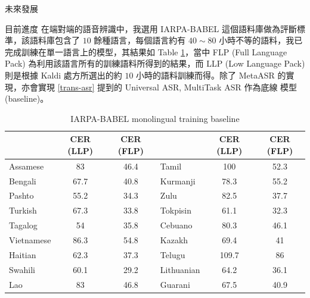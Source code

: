 \documentclass[12pt,UTF8,fntef]{article}
\begin{document}
\begin{section}{未來發展}
  \begin{subsection}{目前進度} \label{progress}
    在端對端的語音辨識中，我選用 IARPA-BABEL 這個語料庫做為評斷標準，該語料庫包含了 $10$ 餘種語言，每個語言約有 $40 \sim 80$ 小時不等的語料，我已完成訓練在單一語言上的模型，其結果如 Table \ref{table:monoASR}，當中 FLP (Full Language Pack) 為利用該語言所有的訓練語料所得到的結果，而 LLP (Low Language Pack) 則是根據 Kaldi 處方所選出的約 $10$ 小時的語料訓練而得。除了 MetaASR 的實現，亦會實現 \ref{trans-asr} 提到的 Universal ASR, MultiTask ASR 作為底線 模型 (baseline)。

\begin{table}[ht]
  \centering
\begin{tabular}{l|c|c|l|c|c|}
\cline{2-3} \cline{5-6}
\multicolumn{1}{c|}{}            & CER (LLP) & CER (FLP) & \multicolumn{1}{c|}{} & CER (LLP) & CER (FLP) \\ \hline
\multicolumn{1}{|l|}{Assamese}   & 83        & 46.4      & Tamil                 & 100       & 52.3      \\ \hline
\multicolumn{1}{|l|}{Bengali}    & 67.7      & 40.8      & Kurmanji              & 78.3      & 55.2      \\ \hline
\multicolumn{1}{|l|}{Pashto}     & 55.2      & 34.3      & Zulu                  & 82.5      & 37.7      \\ \hline
\multicolumn{1}{|l|}{Turkish}    & 67.3      & 33.8      & Tokpisin              & 61.1      & 32.3      \\ \hline
\multicolumn{1}{|l|}{Tagalog}    & 54        & 35.8      & Cebuano               & 80.3      & 46.1      \\ \hline
\multicolumn{1}{|l|}{Vietnamese} & 86.3      & 54.8      & Kazakh                & 69.4      & 41        \\ \hline
\multicolumn{1}{|l|}{Haitian}    & 62.3      & 37.3      & Telugu                & 109.7     & 86        \\ \hline
\multicolumn{1}{|l|}{Swahili}    & 60.1      & 29.2      & Lithuanian            & 64.2      & 36.1      \\ \hline
\multicolumn{1}{|l|}{Lao}        & 83        & 46.8      & Guarani               & 67.5      & 40.9      \\ \hline
\end{tabular}
\caption{IARPA-BABEL monolingual training baseline}
\label{table:monoASR}
\end{table}
  \end{subsection}


\end{section}
\end{document}

